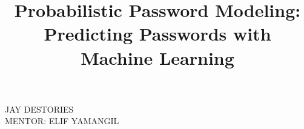 \documentclass{amsart}
\theoremstyle{definition}
\theoremstyle{remark}
\numberwithin{equation}{section}
\begin{document}

\title{Probabilistic Password Modeling: Predicting Passwords with Machine Learning}









\maketitle

\begin{center}
\small{JAY DESTORIES}\\
\small{MENTOR: ELIF YAMANGIL}\\[8ex]
\end{center}






\end{document}

